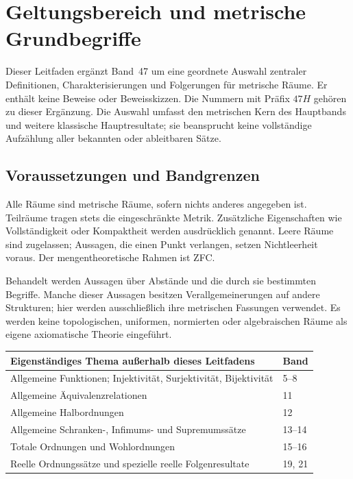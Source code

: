 \chapter{Geltungsbereich und metrische Grundbegriffe}
\label{b47guide:ch:foundations}

Dieser Leitfaden ergänzt Band~47 um eine geordnete Auswahl zentraler
Definitionen, Charakterisierungen und Folgerungen für metrische Räume.
Er enthält keine Beweise oder Beweisskizzen. Die Nummern mit Präfix $47H$
gehören zu dieser Ergänzung. Die Auswahl umfasst den metrischen Kern des
Hauptbands und weitere klassische Hauptresultate; sie beansprucht keine
vollständige Aufzählung aller bekannten oder ableitbaren Sätze.

\section{Voraussetzungen und Bandgrenzen}

Alle Räume sind metrische Räume, sofern nichts anderes angegeben ist.
Teilräume tragen stets die eingeschränkte Metrik. Zusätzliche Eigenschaften
wie Vollständigkeit oder Kompaktheit werden ausdrücklich genannt. Leere
Räume sind zugelassen; Aussagen, die einen Punkt verlangen, setzen
Nichtleerheit voraus. Der mengentheoretische Rahmen ist ZFC.

Behandelt werden Aussagen über Abstände und die durch sie bestimmten
Begriffe. Manche dieser Aussagen besitzen Verallgemeinerungen auf andere
Strukturen; hier werden ausschließlich ihre metrischen Fassungen verwendet.
Es werden keine topologischen, uniformen, normierten oder algebraischen
Räume als eigene axiomatische Theorie eingeführt.

\begin{center}
\small
\begin{tabularx}{\linewidth}{@{}p{.72\linewidth}X@{}}
\toprule
Eigenständiges Thema außerhalb dieses Leitfadens & Band\\
\midrule
Allgemeine Funktionen; Injektivität, Surjektivität, Bijektivität & 5--8\\
Allgemeine Äquivalenzrelationen & 11\\
Allgemeine Halbordnungen & 12\\
Allgemeine Schranken-, Infimums- und Supremumssätze & 13--14\\
Totale Ordnungen und Wohlordnungen & 15--16\\
Reelle Ordnungssätze und spezielle reelle Folgenresultate & 19, 21\\
\bottomrule
\end{tabularx}
\end{center}

